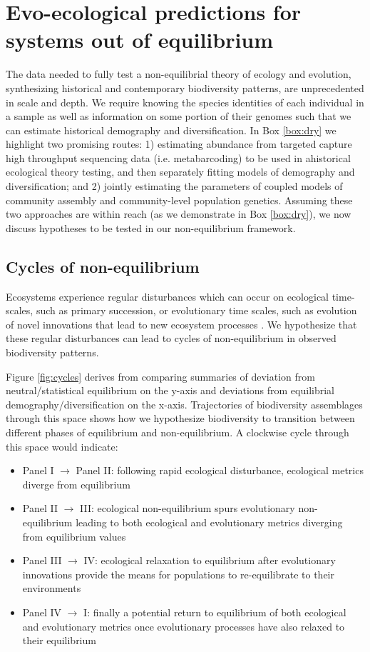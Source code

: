 \documentclass[12pt]{article}
\newcounter{Box}
\begin{document}
\section{Evo-ecological predictions for systems out of equilibrium} \label{sec:pred}

The data needed to fully test a non-equilibrial theory of ecology and
evolution, synthesizing historical and contemporary biodiversity
patterns, are unprecedented in scale and depth. We require
knowing the species identities of each individual in a sample as well
as information on some portion of their genomes such that we can
estimate historical demography and diversification. In Box
\ref{box:dry} we highlight two promising routes: 1) estimating
abundance from targeted capture high throughput sequencing data (i.e.
metabarcoding) to be used in ahistorical ecological theory testing,
and then separately fitting models of demography and diversification;
and 2) jointly estimating the parameters of coupled models of
community assembly and community-level population genetics. Assuming
these two approaches are within reach (as we demonstrate in Box
\ref{box:dry}), we now discuss hypotheses to be tested in our
non-equilibrium framework.

\subsection{Cycles of non-equilibrium}

Ecosystems experience regular disturbances which can
occur on ecological time-scales, such as primary succession, or
evolutionary time scales, such as evolution of novel innovations that
lead to new ecosystem processes \citep{erwin2008}. We
hypothesize that these regular disturbances can lead to cycles of
non-equilibrium in observed biodiversity patterns.

Figure \ref{fig:cycles} derives from comparing summaries of deviation
from neutral/statistical equilibrium on the y-axis and deviations from
equilibrial demography/diversification on the x-axis. Trajectories of
biodiversity assemblages through this space shows how we hypothesize
biodiversity to transition between different phases of equilibrium and
non-equilibrium. A clockwise cycle through this
space would indicate:

\begin{itemize}
\item Panel I $\rightarrow$ Panel II: following rapid ecological
  disturbance, ecological metrics diverge from equilibrium
\item Panel II $\rightarrow$ III: ecological non-equilibrium spurs
  evolutionary non-equilibrium leading to both ecological and
  evolutionary metrics diverging from equilibrium values
\item Panel III $\rightarrow$ IV: ecological relaxation to equilibrium
  after evolutionary innovations provide the means for populations to
  re-equilibrate to their environments
\item Panel IV $\rightarrow$ I: finally a potential return to
  equilibrium of both ecological and evolutionary metrics once
  evolutionary processes have also relaxed to their equilibrium
\end{itemize}
\end{document}
